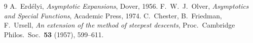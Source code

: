 \documentclass[12pt,a4paper]{amsart}
\theoremstyle{definition}
\begin{document}
\begin{thebibliography}{9}
A.~Erd\'elyi,
\textit{Asymptotic Expansions},
Dover, 1956.
F.~W.~J.~Olver,
\textit{Asymptotics and
Special Functions},
Academic Press, 1974.
C.~Chester, B.~Friedman,
F.~Ursell,
\textit{An extension of the
method of steepest descents},
Proc.\ Cambridge Philos.\ Soc.\
\textbf{53} (1957), 599--611.
\end{thebibliography}
\end{document}
